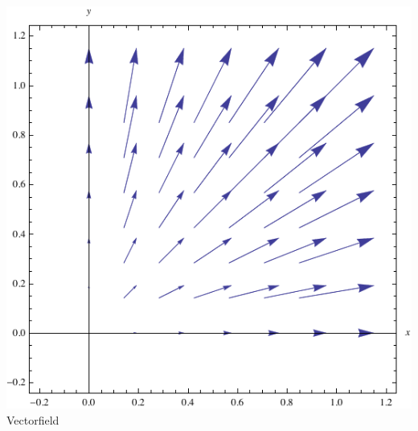 \documentclass[a4paper]{scrartcl}
\begin{document}
\includegraphics[scale=1.0]{images/gauss.pdf}\\ %
Vectorfield\\
\end{document}
